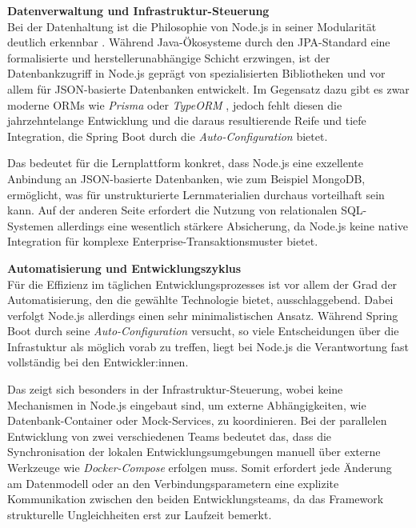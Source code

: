 \vspace{0.7cm}
\textbf{Datenverwaltung und Infrastruktur-Steuerung} \\
Bei der Datenhaltung ist die Philosophie von Node.js in seiner Modularität deutlich erkennbar \cite{NodeJsAbout}. Während Java-Ökosysteme durch den JPA-Standard eine formalisierte und herstellerunabhängige Schicht erzwingen, ist der Datenbankzugriff in Node.js geprägt von spezialisierten Bibliotheken und vor allem für JSON-basierte Datenbanken entwickelt. Im Gegensatz dazu gibt es zwar moderne ORMs wie \textit{Prisma} \cite{Prisma} oder \textit{TypeORM} \cite{TypeORM}, jedoch fehlt diesen die jahrzehntelange Entwicklung und die daraus resultierende Reife und tiefe Integration, die Spring Boot durch die \textit{Auto-Configuration} bietet.

Das bedeutet für die Lernplattform konkret, dass Node.js eine exzellente Anbindung an JSON-basierte Datenbanken, wie zum Beispiel MongoDB, ermöglicht, was für unstrukturierte Lernmaterialien durchaus vorteilhaft sein kann. Auf der anderen Seite erfordert die Nutzung von relationalen SQL-Systemen allerdings eine wesentlich stärkere Absicherung, da Node.js keine native Integration für komplexe Enterprise-Transaktionsmuster bietet.

\vspace{0.7cm}
\textbf{Automatisierung und Entwicklungszyklus} \\
Für die Effizienz im täglichen Entwicklungsprozesses ist vor allem der Grad der Automatisierung, den die gewählte Technologie bietet, ausschlaggebend. Dabei verfolgt Node.js allerdings einen sehr minimalistischen Ansatz. Während Spring Boot durch seine \textit{Auto-Configuration} versucht, so viele Entscheidungen über die Infrastuktur als möglich vorab zu treffen, liegt bei Node.js die Verantwortung fast vollständig bei den Entwickler:innen.

Das zeigt sich besonders in der Infrastruktur-Steuerung, wobei keine Mechanismen in Node.js eingebaut sind, um externe Abhängigkeiten, wie Datenbank-Container oder Mock-Services, zu koordinieren. Bei der parallelen Entwicklung von zwei verschiedenen Teams bedeutet das, dass die Synchronisation der lokalen Entwicklungsumgebungen manuell über externe Werkzeuge wie \textit{Docker-Compose} erfolgen muss. Somit erfordert jede Änderung am Datenmodell oder an den Verbindungsparametern eine explizite Kommunikation zwischen den beiden Entwicklungsteams, da das Framework strukturelle Ungleichheiten erst zur Laufzeit bemerkt.

